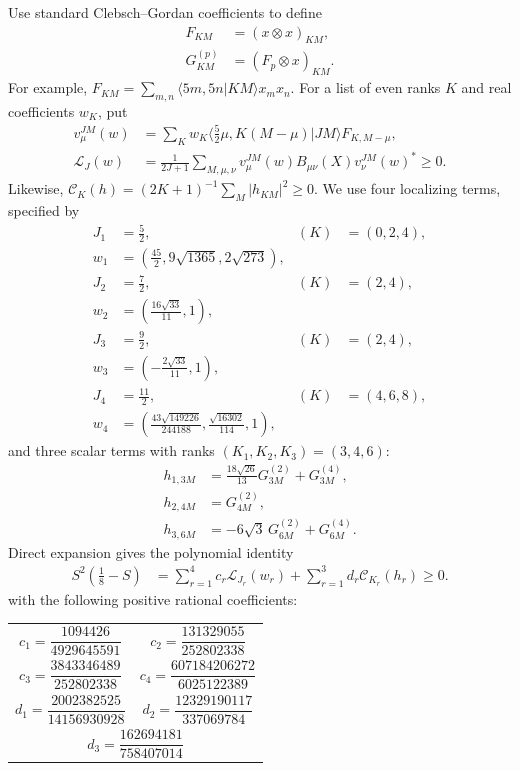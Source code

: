 \documentclass[11pt]{article}
\begin{document}
Use standard Clebsch--Gordan coefficients to define
\begin{align}
 F_{KM}&=(x\otimes x)_{KM},\\
 G^{(p)}_{KM}&=(F_p\otimes x)_{KM}.
\end{align}
For example, $F_{KM}=\sum_{m,n}\langle5m,5n|KM\rangle x_mx_n$.
For a list of even ranks $K$ and real coefficients $w_K$, put
\begin{align}
 v^{JM}_{\mu}(w)&=\sum_Kw_K
 \langle\tfrac52\mu,K(M-\mu)|JM\rangle F_{K,M-\mu},\\
 \mathcal L_J(w)&=\frac1{2J+1}\sum_{M,\mu,\nu}
 v^{JM}_{\mu}(w)B_{\mu\nu}(X)v^{JM}_{\nu}(w)^*\ge0.
\end{align}
Likewise, $\mathcal C_K(h)=(2K+1)^{-1}\sum_M|h_{KM}|^2\ge0$.
We use four localizing terms, specified by
\begin{align}
 J_1&=\tfrac52,&(K)&=(0,2,4),\nonumber\\
 w_1&=(\tfrac{45}{2},9\sqrt{1365},2\sqrt{273}),&&\nonumber\\
 J_2&=\tfrac72,&(K)&=(2,4),\nonumber\\
 w_2&=(\tfrac{16\sqrt{33}}{11},1),&&\nonumber\\
 J_3&=\tfrac92,&(K)&=(2,4),\nonumber\\
 w_3&=(-\tfrac{2\sqrt{33}}{11},1),&&\nonumber\\
 J_4&=\tfrac{11}{2},&(K)&=(4,6,8),\nonumber\\
 w_4&=(\tfrac{43\sqrt{149226}}{244188},
        \tfrac{\sqrt{16302}}{114},1),&&
\end{align}
and three scalar terms with ranks $(K_1,K_2,K_3)=(3,4,6)$:
\begin{align}
 h_{1,3M}&=\tfrac{18\sqrt{26}}{13}G^{(2)}_{3M}+G^{(4)}_{3M},\\
 h_{2,4M}&=G^{(2)}_{4M},\\
 h_{3,6M}&=-6\sqrt3\,G^{(2)}_{6M}+G^{(4)}_{6M}.
\end{align}
Direct expansion gives the polynomial identity
\begin{equation}\label{eq:spin52_P4_certificate}
 \boxed{\begin{aligned} S^2(\tfrac18-S)
 &=\sum_{r=1}^{4}c_r\mathcal L_{J_r}(w_r)
  +\sum_{r=1}^{3}d_r\mathcal C_{K_r}(h_r)\ge0.\end{aligned}}
\end{equation}
with the following positive rational coefficients:
\begin{center}
\renewcommand{\arraystretch}{2.1}
\begin{tabular}{c@{\qquad}c}
$c_1=\dfrac{1094426}{4929645591}$&
$c_2=\dfrac{131329055}{252802338}$\\
$c_3=\dfrac{3843346489}{252802338}$&
$c_4=\dfrac{607184206272}{6025122389}$\\
$d_1=\dfrac{2002382525}{14156930928}$&
$d_2=\dfrac{12329190117}{337069784}$\\
\multicolumn{2}{c}{$d_3=\dfrac{162694181}{758407014}$}
\end{tabular}
\end{center}
\end{document}
